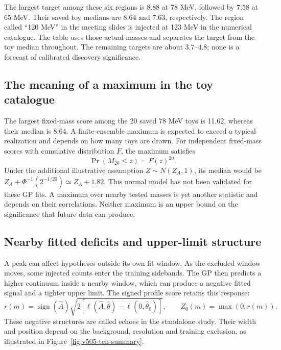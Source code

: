 
The largest target among these six regions is $8.88$ at 78 MeV, followed by
$7.58$ at 65 MeV. Their saved toy medians are $8.64$ and $7.63$, respectively.
The region called ``120 MeV'' in the meeting slides is injected at 123 MeV
in the numerical catalogue. The table uses those actual masses and separates
the target from the toy median throughout. The remaining targets are about
$3.7$--$4.8$; none is a forecast of calibrated discovery significance.

\subsection{The meaning of a maximum in the toy catalogue}
The largest fixed-mass score among the 20 saved 78 MeV toys is 11.62, whereas
their median is 8.64. A finite-ensemble maximum is expected to exceed a
typical realization and depends on how many toys are drawn. For independent
fixed-mass scores with cumulative distribution $F$, the maximum satisfies
\begin{equation}
 \Pr(M_{20}\leq z)=F(z)^{20}.
\end{equation}
Under the additional illustrative assumption $Z\sim N(Z_A,1)$, its median
would be $Z_A+\Phi^{-1}(2^{-1/20})\simeq Z_A+1.82$. This normal model has
not been validated for these GP fits. A maximum over nearby tested masses
is yet another statistic and depends on their correlations. Neither maximum
is an upper bound on the significance that future data can produce.

\subsection{Nearby fitted deficits and upper-limit structure}
A peak can affect hypotheses outside its own fit window. As the excluded
window moves, some injected counts enter the training sidebands. The GP
then predicts a higher continuum inside a nearby window, which can produce
a negative fitted signal and a tighter upper limit. The signed profile score
retains this response:
\begin{equation}
 r(m)=\operatorname{sign}(\widehat A)
 \sqrt{2[\ell(\widehat A,\widehat\theta)-\ell(0,\widehat\theta_0)]},
 \qquad Z_0(m)=\max(0,r(m)).
\end{equation}
These negative structures are called echoes in the standalone study.
Their width and position depend on the background, resolution and training
exclusion, as illustrated in Figure~\ref{fig:v505-ten-summary}.

